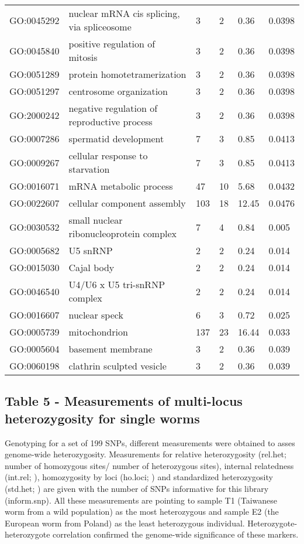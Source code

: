 \documentclass[10pt]{bmc_article}
\newenvironment{bmcformat}{\begin{raggedright}\baselineskip20pt\sloppy\setboolean{publ}{false}}{\end{raggedright}\baselineskip20pt\sloppy}
\begin{document}
\begin{bmcformat}
\begin{longtable}{lp{4.5cm}llll}
  GO:0045292 & nuclear mRNA cis splicing, via spliceosome &   3 &   2 & 0.36 & 0.0398 \\ 
  GO:0045840 & positive regulation of mitosis &   3 &   2 & 0.36 & 0.0398 \\ 
  GO:0051289 & protein homotetramerization &   3 &   2 & 0.36 & 0.0398 \\ 
  GO:0051297 & centrosome organization &   3 &   2 & 0.36 & 0.0398 \\ 
  GO:2000242 & negative regulation of reproductive process &   3 &   2 & 0.36 & 0.0398 \\ 
  GO:0007286 & spermatid development &   7 &   3 & 0.85 & 0.0413 \\ 
  GO:0009267 & cellular response to starvation &   7 &   3 & 0.85 & 0.0413 \\ 
  GO:0016071 & mRNA metabolic process &  47 &  10 & 5.68 & 0.0432 \\ 
  GO:0022607 & cellular component assembly & 103 &  18 & 12.45 & 0.0476 \\ 
   \hline
GO:0030532 & small nuclear ribonucleoprotein complex &   7 &   4 & 0.84 & 0.005 \\ 
  GO:0005682 & U5 snRNP &   2 &   2 & 0.24 & 0.014 \\ 
  GO:0015030 & Cajal body &   2 &   2 & 0.24 & 0.014 \\ 
  GO:0046540 & U4/U6 x U5 tri-snRNP complex &   2 &   2 & 0.24 & 0.014 \\ 
  GO:0016607 & nuclear speck &   6 &   3 & 0.72 & 0.025 \\ 
  GO:0005739 & mitochondrion & 137 &  23 & 16.44 & 0.033 \\ 
  GO:0005604 & basement membrane &   3 &   2 & 0.36 & 0.039 \\ 
  GO:0060198 & clathrin sculpted vesicle &   3 &   2 & 0.36 & 0.039 \\ 
   \hline
\hline
\end{longtable}
\subsection*{Table 5 - Measurements of multi-locus heterozygosity for
  single worms}

Genotyping for a set of 199 SNPs, different
measurements were obtained to asses genome-wide
heterozygosity. Measurements for relative heterozygosity (rel.het;
number of homozygous sites/ number of heterozygous sites), internal
relatedness (int.rel; \cite{pmid11571049}), homozygosity by loci
(ho.loci; \cite{pmid17107491}) and standardized heterozygosity
(std.het; \cite{coltman81j}) are given with the number of SNPs
informative for this library (inform.snp). All these measurements are
pointing to sample T1 (Taiwanese worm from a wild population) as the
most heterozygous and sample E2 (the European worm from Poland) as the
least heterozygous individual. Heterozygote-heterozygote correlation
\cite{pmid21565077} confirmed the genome-wide significance of these
markers.


\end{bmcformat}
\end{document}
